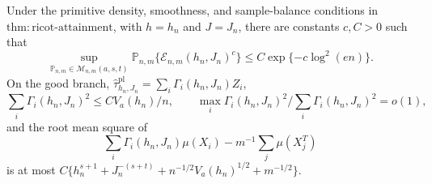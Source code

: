 Under the primitive density, smoothness, and sample-balance conditions in \(\mathrm{thm:ricot\text{-}attainment}\), with \(h=h_n\) and \(J=J_n\), there are constants \(c,C>0\) such that
\[
\sup_{\mathbb P_{n,m}\in\mathcal M_{n,m}(a,s,t)}\mathbb P_{n,m}\{\mathcal E_{n,m}(h_n,J_n)^c\}\le C\exp\{-c\log^2(en)\}.
\]
On the good branch, \(\widehat\tau^{\mathrm{pl}}_{h_n,J_n}=\sum_i\Gamma_i(h_n,J_n)Z_i\),
\[
\sum_i\Gamma_i(h_n,J_n)^2\le C V_a(h_n)/n,
\qquad
\max_i\Gamma_i(h_n,J_n)^2\big/\sum_i\Gamma_i(h_n,J_n)^2=o(1),
\]
and the root mean square of
\[
\sum_i\Gamma_i(h_n,J_n)\mu(X_i)-m^{-1}\sum_j\mu(X_j^T)
\]
is at most \(C\{h_n^{s+1}+J_n^{-(s+t)}+n^{-1/2}V_a(h_n)^{1/2}+m^{-1/2}\}\).